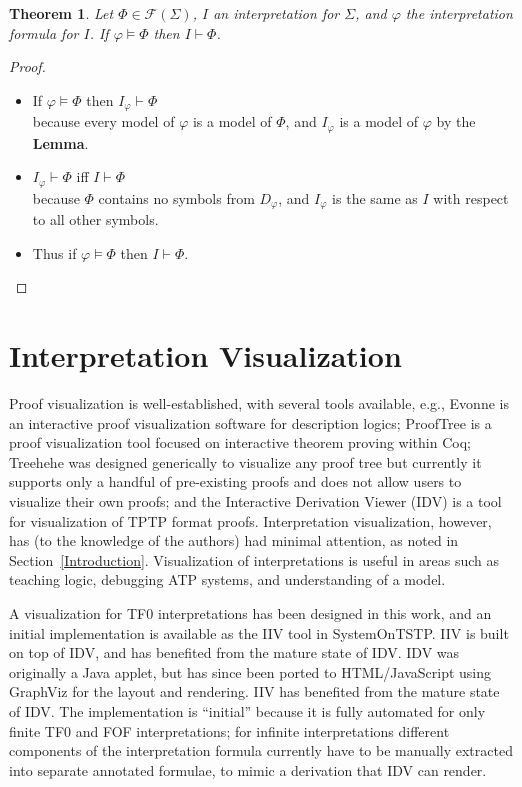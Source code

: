 \documentclass{easychair}
\newtheorem*{theorem}{Theorem}
\begin{document}
\begin{theorem}
Let $\Phi \in \mathcal{F}(\Sigma)$, $I$ an interpretation for $\Sigma$, and $\varphi$ the
interpretation formula for $I$.
If $\varphi \models \Phi$ then $I \vdash \Phi$.
\end{theorem}
\begin{proof}
~\linebreak
\vspace*{-1.5em}
\begin{itemize}
\item If $\varphi \models \Phi$ then $I_{\varphi} \vdash \Phi$ \\
      because every model of $\varphi$ is a model of $\Phi$, and $I_{\varphi}$ is a model
      of $\varphi$ by the {\bf Lemma}.
\item $I_{\varphi} \vdash \Phi$ iff $I \vdash \Phi$ \\
      because $\Phi$ contains no symbols from $D_{\varphi}$, and $I_{\varphi}$ is the same
      as $I$ with respect to all other symbols.
\item Thus if $\varphi \models \Phi$ then $I \vdash \Phi$.
\end{itemize}
\end{proof}

\section{Interpretation Visualization}
\label{Visualization}

Proof visualization is well-established, with several tools available, e.g., 
Evonne \cite{AB+22} is an interactive proof visualization software for description logics;
ProofTree \cite{Tew17} is a proof visualization tool focused on interactive theorem proving 
within Coq;
Treehehe \cite{Bat18} was designed generically to visualize any proof tree but currently it 
supports only a handful of pre-existing proofs and does not allow users to visualize their own 
proofs;
and the Interactive Derivation Viewer (IDV) \cite{TPS07} is a tool for visualization of 
TPTP format proofs.
Interpretation visualization, however, has (to the knowledge of the authors) had minimal 
attention, as noted in Section~\ref{Introduction}. 
Visualization of interpretations is useful in areas such as teaching logic, debugging ATP 
systems, and understanding of a model.

A visualization for TF0 interpretations has been designed in this work, and an initial
implementation is available as the IIV tool in SystemOnTSTP.
IIV is built on top of IDV, and has benefited from the mature state of IDV.
IDV was originally a Java applet, but has since been ported to HTML/JavaScript using GraphViz
\cite{EG+02} for the layout and rendering.
IIV has benefited from the mature state of IDV.
The implementation is ``initial'' because it is fully automated for only finite TF0 and FOF
interpretations; for infinite interpretations different components of the interpretation formula 
currently have to be manually extracted into separate annotated formulae, to mimic a derivation 
that IDV can render.
\end{document}
